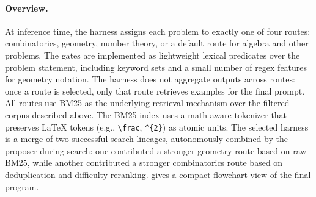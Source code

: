 \paragraph{Overview.}
At inference time, the harness assigns each problem to exactly one of four routes: combinatorics, geometry, number theory, or a default route for algebra and other problems.
The gates are implemented as lightweight lexical predicates over the problem statement, including keyword sets and a small number of regex features for geometry notation.
The harness does not aggregate outputs across routes: once a route is selected, only that route retrieves examples for the final prompt.
All routes use BM25 as the underlying retrieval mechanism over the filtered corpus described above.
The BM25 index uses a math-aware tokenizer that preserves LaTeX tokens (e.g., \texttt{\textbackslash frac}, \texttt{\^{}\{2\}}) as atomic units.
The selected harness is a merge of two successful search lineages, autonomously combined by the proposer during search: one contributed a stronger geometry route based on raw BM25, while another contributed a stronger combinatorics route based on deduplication and difficulty reranking.
 gives a compact flowchart view of the final program.

